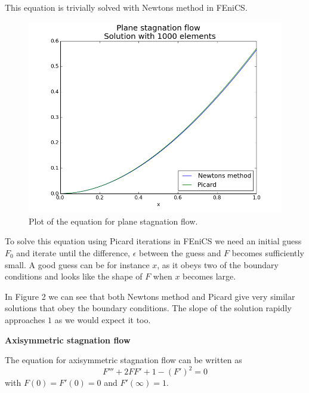 \documentclass[11pt,a4paper,english]{article}
\numberwithin{equation}{section}
\begin{document}
This equation is trivially solved with Newtons method in FEniCS.

\begin{figure}[h!]
\begin{center}
  \includegraphics[scale=0.4]{plane_stag.png}
  \end{center}
  \caption{Plot of the equation for plane stagnation flow.}
  \label{fig:stokes_square}
\end{figure}

To solve this equation using Picard iterations in FEniCS we need an initial guess $F_0$ and iterate until the difference, $\epsilon$ between the guess and $F$ becomes sufficiently small. A good guess can be  for instance $x$, as it obeys two of the boundary conditions and looks like the shape of $F$ when $x$ becomes large.   

In Figure 2 we can see that both Newtons method and Picard give very similar solutions that obey the boundary conditions. The slope of the solution rapidly approaches $1$ as we would expect it too.     

\textbf{Axisymmetric stagnation flow}

The equation for axisymmetric stagnation flow can be written as
\begin{equation}
F''' + 2FF' + 1 - (F')^2 = 0
\end{equation}
with $F(0) = F'(0) = 0$ and $F'(\infty)=1$.
\end{document}
